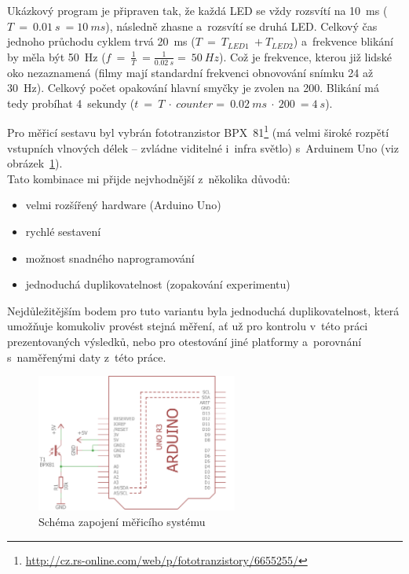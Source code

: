 Ukázkový program je připraven tak, že každá LED se vždy rozsvítí na 10~ms ($T~=~0.01~s~= 10~ms$), následně zhasne a~rozsvítí se druhá LED. 
Celkový čas jednoho průchodu cyklem trvá 20~ms ($T~=~T_{LED1}~+ T_{LED2}$) a~frekvence blikání by měla být 50~Hz ($f~=~\frac{1}{T}~= \frac{1}{0.02~s} =~50~Hz$). 
Což je frekvence, kterou již lidské oko nezaznamená (filmy mají standardní frekvenci obnovování snímku 24 až 30~Hz). %
Celkový počet opakování hlavní smyčky je zvolen na 200. 
Blikání má tedy probíhat 4~sekundy ($t~=~T~\cdot~counter =~0.02~ms~\cdot~200~= 4~s$).

Pro měřicí sestavu byl vybrán fototranzistor BPX~81\footnote{\url{http://cz.rs-online.com/web/p/fototranzistory/6655255/}} (má velmi široké rozpětí vstupních vlnových délek -- zvládne viditelné i~infra světlo) s~Arduinem Uno (viz obrázek~\ref{fig:arduino-measuring-system}). \\


Tato kombinace mi přijde nejvhodnější z~několika důvodů: 

\begin{itemize}
	\item velmi rozšířený hardware (Arduino Uno)
	\item rychlé sestavení
	\item možnost snadného naprogramování
	\item jednoduchá duplikovatelnost (zopakování experimentu)
\end{itemize}  

Nejdůležitějším bodem pro tuto variantu byla jednoduchá duplikovatelnost, která umožňuje komukoliv provést stejná měření, ať už pro kontrolu v~této práci prezentovaných výsledků, nebo pro otestování jiné platformy a~porovnání s~naměřenými daty z~této práce.


\begin{figure}[h]
	\centering
	\includegraphics[width=250px]{images/measuring-arduino-system_schema.png}	
	\caption[Schéma zapojení měřicího systému]{Schéma zapojení měřicího systému}
	\label{fig:arduino-measuring-system}
\end{figure}

